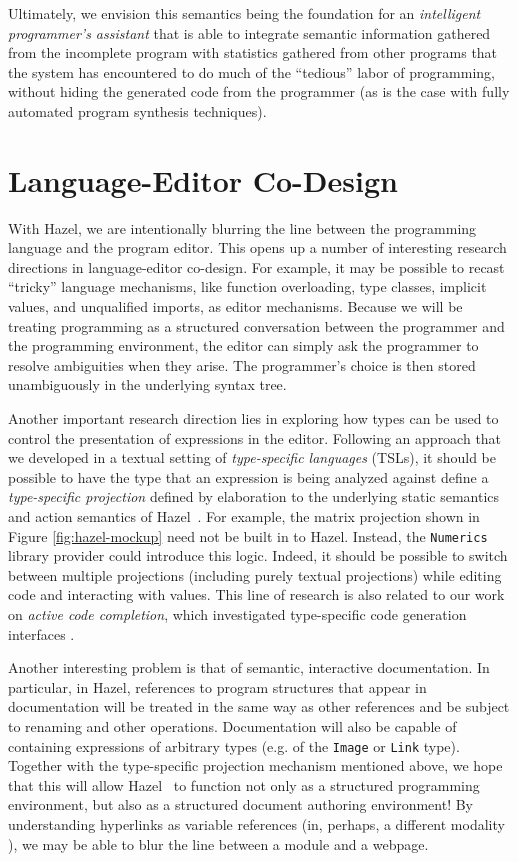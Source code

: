 \documentclass[letterpaper,USenglish]{lipics-v2016}
\let\li\lstinline
\newcommand{\Hazel}[0]{\textsf{Hazel}}
\newcommand{\HazelEnv}[0]{\Hazel}
\begin{document}
Ultimately, we envision this semantics being the foundation for an \emph{intelligent programmer's assistant} that is able to integrate semantic information gathered from the incomplete program with statistics gathered from other programs that the system has encountered to do much of the ``tedious'' labor of programming, without hiding the generated code from the programmer (as is the case with fully automated program synthesis techniques). 

\section{Language-Editor Co-Design}

With \HazelEnv, we are intentionally blurring the line between the programming language and the program editor. This opens up a number of interesting research directions in {language-editor co-design}. For example, it may be possible to recast  ``tricky'' language mechanisms, like function overloading, type classes, implicit values, and unqualified imports, as editor mechanisms. Because we will be treating programming as a structured conversation between the programmer and the programming environment, the editor can simply ask the programmer to resolve ambiguities when they arise. The programmer's choice is then stored unambiguously in the underlying syntax tree.

Another important research
direction lies in exploring how types can be used to control  
the presentation of expressions in the editor. Following an
approach that we developed in a textual setting of \emph{type-specific
languages} (TSLs), it should be possible to have the type that an
expression is being analyzed against define a \emph{type-specific projection} defined by elaboration to the underlying static semantics and action semantics of \HazelEnv ~\cite{TSLs}. For example, the matrix projection shown in Figure \ref{fig:hazel-mockup} need not be built in to \HazelEnv. Instead, the \li{Numerics} library provider could introduce this logic. Indeed, it should be possible to switch between multiple projections (including purely textual projections) while editing code and interacting with values. This line of research is also related to our work on \emph{active code completion}, which investigated type-specific code generation interfaces \cite{Omar:2012:ACC:2337223.2337324}. 

Another interesting problem is that of {semantic, interactive documentation}. In particular, in \HazelEnv, references to program structures that appear in documentation will be treated in the same way as other references and be subject to renaming and other operations. Documentation will also be capable of containing expressions of arbitrary types (e.g. of the \li{Image} or \li{Link} type). Together with the type-specific projection mechanism mentioned above, we hope that this will allow \HazelEnv~ to function not only as a structured programming environment, but also as a {structured document authoring environment}! By understanding hyperlinks as variable references (in, perhaps, a different modality \cite{vii2007type}), we may be able to blur the line between a module and a webpage. 
\end{document}
